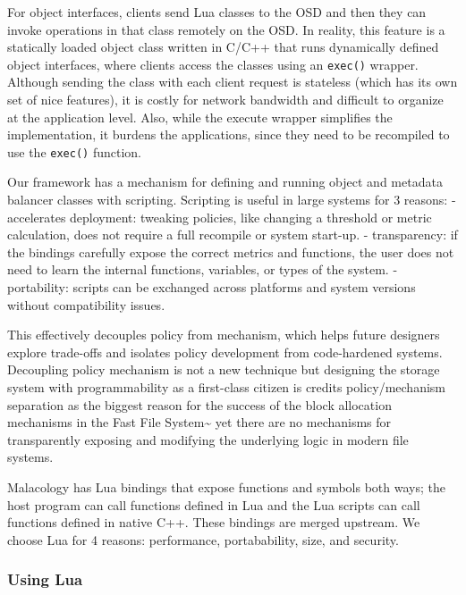 \documentclass[10pt,twocolumn]{article}
\begin{document}
For object interfaces, clients send Lua classes to the OSD and then they
can invoke operations in that class remotely on the OSD. In reality,
this feature is a statically loaded object class written in C/C++ that
runs dynamically defined object interfaces, where clients access the
classes using an \texttt{exec()} wrapper. Although sending the class
with each client request is stateless (which has its own set of nice
features), it is costly for network bandwidth and difficult to organize
at the application level. Also, while the execute wrapper simplifies the
implementation, it burdens the applications, since they need to be
recompiled to use the \texttt{exec()} function.

Our framework has a mechanism for defining and running object and
metadata balancer classes with scripting. Scripting is useful in large
systems for 3 reasons: - accelerates deployment: tweaking policies, like
changing a threshold or metric calculation, does not require a full
recompile or system start-up. - transparency: if the bindings carefully
expose the correct metrics and functions, the user does not need to
learn the internal functions, variables, or types of the system. -
portability: scripts can be exchanged across platforms and system
versions without compatibility issues.

This effectively decouples policy from mechanism, which helps future
designers explore trade-offs and isolates policy development from
code-hardened systems. Decoupling policy mechanism is not a new
technique but designing the storage system with programmability as a
first-class citizen is credits policy/mechanism separation as the
biggest reason for the success of the block allocation mechanisms in the
Fast File System\textasciitilde{}\cite{mckusick:fast2015-FFS} yet there
are no mechanisms for transparently exposing and modifying the
underlying logic in modern file systems.

Malacology has Lua bindings that expose functions and symbols both ways;
the host program can call functions defined in Lua and the Lua scripts
can call functions defined in native C++. These bindings are merged
upstream. We choose Lua for 4 reasons: performance, portabability, size,
and security.

\subsubsection{Using Lua}\label{using-lua}
\end{document}
